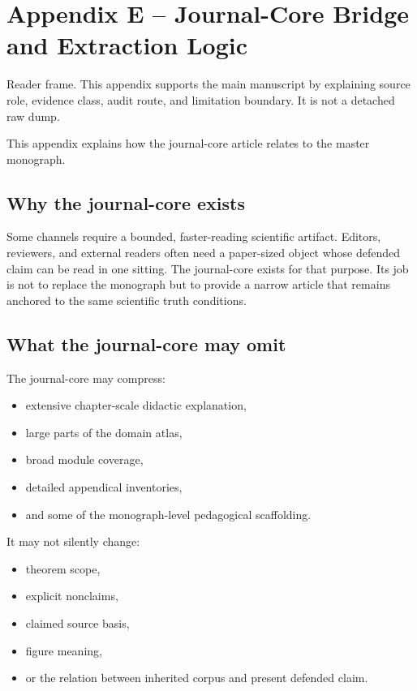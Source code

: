 \section{Appendix E -- Journal-Core Bridge and Extraction Logic}
Reader frame. This appendix supports the main manuscript by explaining source role, evidence class, audit route, and limitation boundary. It is not a detached raw dump.

\label{sec:oc13-journal-core-bridge}

This appendix explains how the journal-core article relates to the master monograph.

\subsection{Why the journal-core exists}

Some channels require a bounded, faster-reading scientific artifact.
Editors, reviewers, and external readers often need a paper-sized object whose defended claim can
be read in one sitting.
The journal-core exists for that purpose.
Its job is not to replace the monograph but to provide a narrow article that remains anchored to
the same scientific truth conditions.

\subsection{What the journal-core may omit}

The journal-core may compress:

\begin{itemize}
\item extensive chapter-scale didactic explanation,
\item large parts of the domain atlas,
\item broad module coverage,
\item detailed appendical inventories,
\item and some of the monograph-level pedagogical scaffolding.
\end{itemize}

It may not silently change:

\begin{itemize}
\item theorem scope,
\item explicit nonclaims,
\item claimed source basis,
\item figure meaning,
\item or the relation between inherited corpus and present defended claim.
\end{itemize}

